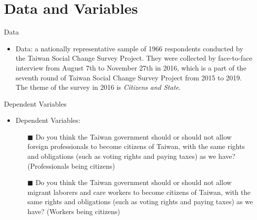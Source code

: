 \documentclass[12pt]{beamer}
\begin{document}
 \section{Data and Variables} %
 \begin{frame}{Data}
\begin{itemize}
\item Data: a nationally representative sample of 1966 respondents conducted by the Taiwan Social Change Survey Project.  They were collected by face-to-face interview from August 7th to November 27th in 2016, which is a part of the seventh round of Taiwan Social Change Survey Project from 2015 to 2019. The theme of the survey in 2016 is \emph{Citizens and State}. 
\end{itemize}
\end{frame}
 \begin{frame}{Dependent Variables}
\begin{itemize}
\item Dependent Variables: 
\begin{itemize}
\item [$\blacksquare$]Do you think the Taiwan government should or should not  allow foreign professionals to become citizens of Taiwan, with the same 
rights and obligations (such as voting rights and paying taxes) as we have? (Professionals being citizens)    
\item [$\blacksquare$]Do you think the Taiwan government should or should not 
 allow migrant laborers and care workers to become citizens 
 of Taiwan, with the same rights and obligations (such as voting 
rights and paying taxes) as we have? (Workers being citizens)  
\end{itemize}
\end{itemize}
\end{frame}
\end{document}
